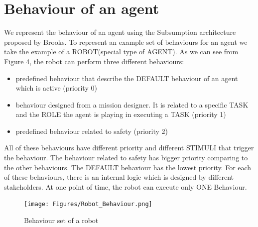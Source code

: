 \documentclass[journal]{IEEEtran}
\theoremstyle{definition}
\begin{document}
\section{Behaviour of an agent}
We represent the behaviour of an agent using the   {Subsumption architecture} proposed by Brooks.
To represent an example set of behaviours for an agent we take the example of a ROBOT(special type of AGENT). As we can see from Figure 4, the robot can perform three different behaviours:
\begin{itemize}
\item predefined behaviour that describe the DEFAULT behaviour of an agent which is active (priority 0)
\item behaviour designed from a mission designer. It is  related to a specific TASK and the ROLE the agent is playing in executing a TASK (priority 1)
\item predefined behaviour related to safety (priority 2)
\end{itemize}
All of these behaviours have different priority and different STIMULI that trigger the behaviour. The behaviour related to safety has bigger priority comparing to the other behaviours. The DEFAULT behaviour has the lowest priority. 
For each of these behaviours, there is an internal logic which is designed by different stakeholders.  
At one point of time, the robot can execute only ONE Behaviour. 
 \begin{figure}[h]
\texttt{[image: Figures/Robot\_Behaviour.png]}
\caption{Behaviour set of a robot}
\end{figure}
\end{document}
